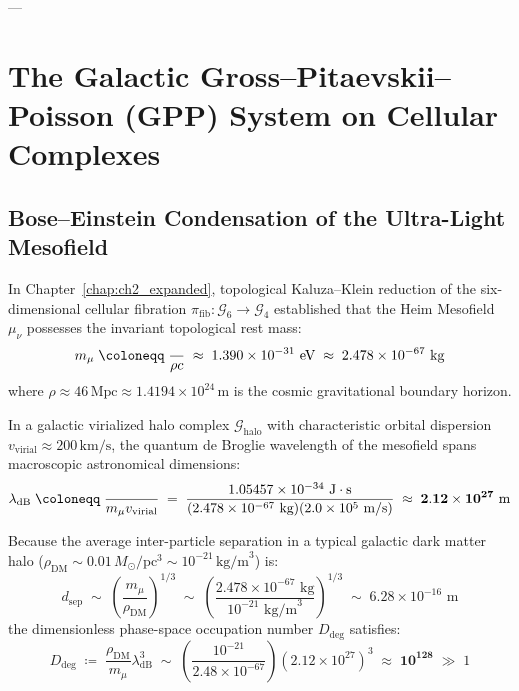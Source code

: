 \documentclass[
    12pt,
    a4paper,
    headings=normal,
    twoside=false,
    open=any,
    parskip=half
]{scrbook}
\let\hbar\relax
\begin{document}
---

\section{The Galactic Gross--Pitaevskii--Poisson (GPP) System on Cellular Complexes}
\label{sec:ch11_gross_pitaevskii_poisson}

\subsection{Bose--Einstein Condensation of the Ultra-Light Mesofield}

In Chapter~\ref{chap:ch2_expanded}, topological Kaluza--Klein reduction of the six-dimensional cellular fibration $\pi_{\text{fib}} \colon \mathcal{G}_6 \to \mathcal{G}_4$ established that the Heim Mesofield $\mu_\nu$ possesses the invariant topological rest mass:
\begin{equation}
m_\mu \;\coloneqq\; \frac{\hbar}{\rho c} \;\approx\; 1.390 \times 10^{-31} \text{ eV} \;\approx\; 2.478 \times 10^{-67} \text{ kg}
\label{eq:ch11_mesofield_mass_recap}
\end{equation}
where $\rho \approx 46\,\text{Mpc} \approx 1.4194 \times 10^{24}\,\text{m}$ is the cosmic gravitational boundary horizon.

In a galactic virialized halo complex $\mathcal{G}_{\text{halo}}$ with characteristic orbital dispersion $v_{\text{virial}} \approx 200\,\text{km/s}$, the quantum de Broglie wavelength of the mesofield spans macroscopic astronomical dimensions:
\begin{equation}
\lambda_{\text{dB}} \;\coloneqq\; \frac{\hbar}{m_\mu v_{\text{virial}}} \;=\; \frac{1.05457 \times 10^{-34} \text{ J}\cdot\text{s}}{(2.478 \times 10^{-67} \text{ kg})(2.0 \times 10^5 \text{ m/s})} \;\approx\; \mathbf{2.12 \times 10^{27} \text{ m}}
\label{eq:ch11_debroglie_wavelength_galactic}
\end{equation}

Because the average inter-particle separation in a typical galactic dark matter halo ($\rho_{\text{DM}} \sim 0.01\,M_\odot/\text{pc}^3 \sim 10^{-21}\,\text{kg/m}^3$) is:
\begin{equation}
d_{\text{sep}} \;\sim\; \left( \frac{m_\mu}{\rho_{\text{DM}}} \right)^{1/3} \;\sim\; \left( \frac{2.478 \times 10^{-67} \text{ kg}}{10^{-21} \text{ kg/m}^3} \right)^{1/3} \;\sim\; 6.28 \times 10^{-16} \text{ m}
\end{equation}
the dimensionless phase-space occupation number $D_{\text{deg}}$ satisfies:
\begin{equation}
D_{\text{deg}} \;\coloneqq\; \frac{\rho_{\text{DM}}}{m_\mu} \lambda_{\text{dB}}^3 \;\sim\; \left( \frac{10^{-21}}{2.48 \times 10^{-67}} \right) \left( 2.12 \times 10^{27} \right)^3 \;\approx\; \mathbf{10^{128}} \;\gg\; 1
\label{eq:ch11_phase_space_density_degeneracy}
\end{equation}
\end{document}
